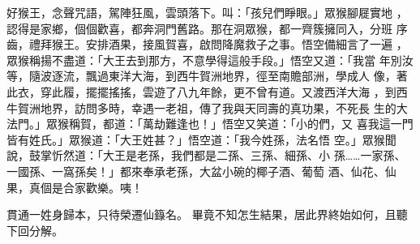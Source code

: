 \begin{pinyinscope}
{好猴王，念聲咒語，駕陣狂風，雲頭落下。叫：「孩兒們睜眼。」眾猴腳屣實地
，認得是家鄉，個個歡喜，都奔洞門舊路。那在洞眾猴，都一齊簇擁同入，分班
序齒，禮拜猴王。安排酒果，接風賀喜，啟問降魔救子之事。悟空備細言了一遍
，眾猴稱揚不盡道：「大王去到那方，不意學得這般手段。」悟空又道：「我當
年別汝等，隨波逐流，飄過東洋大海，到西牛賀洲地界，徑至南贍部洲，學成人
像，著此衣，穿此履，擺擺搖搖，雲遊了八九年餘，更不曾有道。又渡西洋大海
，到西牛賀洲地界，訪問多時，幸遇一老祖，傳了我與天同壽的真功果，不死長
生的大法門。」眾猴稱賀，都道：「萬劫難逢也！」悟空又笑道：「小的們，又
喜我這一門皆有姓氏。」眾猴道：「大王姓甚？」悟空道：「我今姓孫，法名悟
空。」眾猴聞說，鼓掌忻然道：「大王是老孫，我們都是二孫、三孫、細孫、小
孫……一家孫、一國孫、一窩孫矣！」都來奉承老孫，大盆小碗的椰子酒、葡萄
酒、仙花、仙果，真個是合家歡樂。咦！

    貫通一姓身歸本，只待榮遷仙籙名。
    畢竟不知怎生結果，居此界終始如何，且聽下回分解。





}
\end{pinyinscope}
